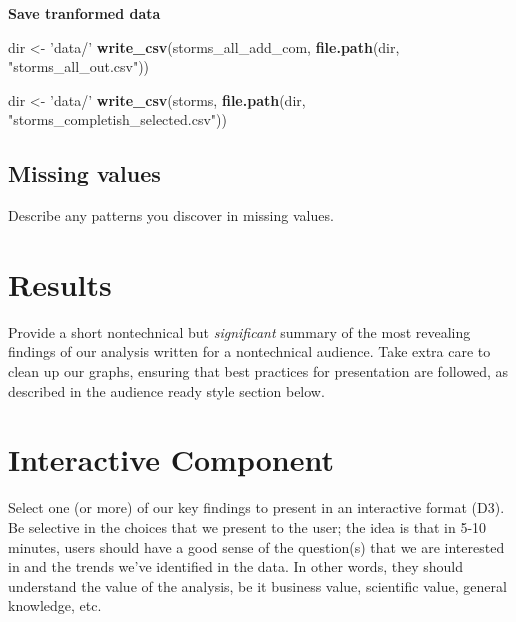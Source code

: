 \documentclass[]{book}
\newenvironment{Shaded}{\begin{snugshade}}{\end{snugshade}}
\newcommand{\KeywordTok}[1]{\textcolor[rgb]{0.13,0.29,0.53}{\textbf{#1}}}
\newcommand{\NormalTok}[1]{#1}
\newcommand{\StringTok}[1]{\textcolor[rgb]{0.31,0.60,0.02}{#1}}
\begin{document}
\textbf{Save tranformed data}

\begin{Shaded}
\begin{Highlighting}[]
\NormalTok{dir <-}\StringTok{ 'data/'}
\KeywordTok{write_csv}\NormalTok{(storms_all_add_com, }\KeywordTok{file.path}\NormalTok{(dir, }\StringTok{"storms_all_out.csv"}\NormalTok{))}
\end{Highlighting}
\end{Shaded}

\begin{Shaded}
\begin{Highlighting}[]
\NormalTok{dir <-}\StringTok{ 'data/'}
\KeywordTok{write_csv}\NormalTok{(storms, }\KeywordTok{file.path}\NormalTok{(dir, }\StringTok{"storms_completish_selected.csv"}\NormalTok{))}
\end{Highlighting}
\end{Shaded}

\hypertarget{missing-values}{%
\section{Missing values}\label{missing-values}}

Describe any patterns you discover in missing values.

\hypertarget{results}{%
\chapter{Results}\label{results}}

Provide a short nontechnical but \emph{significant} summary of the most revealing findings of our analysis written for a nontechnical audience. Take extra care to clean up our graphs, ensuring that best practices for presentation are followed, as described in the audience ready style section below.

\hypertarget{interactive-component}{%
\chapter{Interactive Component}\label{interactive-component}}

Select one (or more) of our key findings to present in an interactive format (D3). Be selective in the choices that we present to the user; the idea is that in 5-10 minutes, users should have a good sense of the question(s) that we are interested in and the trends we've identified in the data. In other words, they should understand the value of the analysis, be it business value, scientific value, general knowledge, etc.
\end{document}
